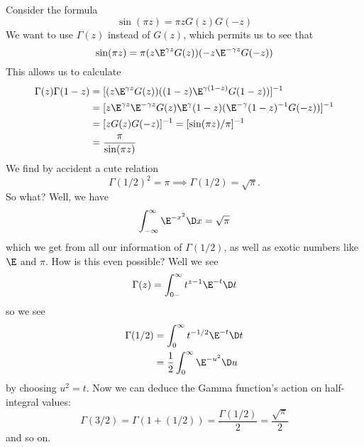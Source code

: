 Consider the formula
\begin{equation}
\sin(\pi z)=\pi zG(z)G(-z)
\end{equation}
We want to use $\Gamma(z)$ instead of $G(z)$, which permits us to
see that
\begin{equation}
\sin(\pi z)=\pi (z\E^{\gamma z}G(z))(-z\E^{-\gamma z}G(-z))
\end{equation}
This allows us to calculate
\begin{subequations}
\begin{align}
\Gamma(z)\Gamma(1-z) &= [(z\E^{\gamma z}G(z))((1-z)\E^{\gamma(1-z)}G(1-z))]^{-1}\\
&=[z\E^{\gamma z}\E^{-\gamma z}G(z)\E^{\gamma}(1-z)(\E^{-\gamma}(1-z)^{-1}G(-z))]^{-1}\\
&=[zG(z)G(-z)]^{-1} = [\sin(\pi z)/\pi]^{-1}\\
&=\frac{\pi}{\sin(\pi z)}
\end{align}
\end{subequations}
We find by accident a cute relation
\begin{equation}
\Gamma(1/2)^{2}=\pi\implies\Gamma(1/2)=\sqrt{\pi}.
\end{equation}
So what? Well, we have
\begin{equation}
\int^{\infty}_{-\infty}\E^{-x^{2}}\D x=\sqrt{\pi}
\end{equation}
which we get from all our information of $\Gamma(1/2)$, as well
as exotic numbers like $\E$ and $\pi$. How is this even possible?
Well we see
\begin{equation}
\Gamma(z)=\int^{\infty}_{0-}t^{z-1}\E^{-t}\D t
\end{equation}
so we see
\begin{subequations}
\begin{align}
\Gamma(1/2) &= \int^{\infty}_{0}t^{-1/2}\E^{-t}\D t\\
&= \frac{1}{2}\int^{\infty}_{0}\E^{-u^{2}}\D u
\end{align}
\end{subequations}
by choosing $u^{2}=t$. Now we can deduce the Gamma function's
action on half-integral values:
\begin{equation}
\Gamma(3/2)=\Gamma(1+(1/2))=\frac{\Gamma(1/2)}{2}=\frac{\sqrt{\pi}}{2}
\end{equation}
and so on.

